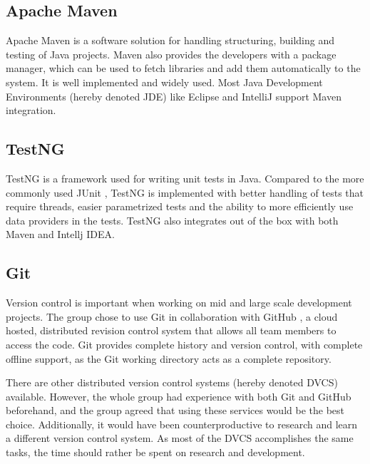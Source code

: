 \subsection{Apache Maven}
\label{subsec:prestudies-tools-apache_maven}

Apache Maven is a software solution for handling structuring, building and testing of Java projects. Maven also provides the developers with a package manager, which can be used to fetch libraries and add them automatically to the system. It is well implemented and widely used. Most Java Development Environments (hereby denoted JDE) like Eclipse and IntelliJ support Maven integration.

\subsection{TestNG}
\label{subsec:prestudies-tools-testng}

TestNG \cite{test-ng} is a framework used for writing unit tests in Java. Compared to the more commonly used JUnit \cite{junit}, TestNG is implemented with better handling of tests that require threads, easier parametrized tests and the ability to more efficiently use data providers in the tests. TestNG also integrates out of the box with both Maven and Intellj IDEA.

\subsection{Git}
\label{subsec:prestudies-tools-git}

Version control is important when working on mid and large scale development projects. The group chose to use Git \cite{git} in collaboration with GitHub \cite{github}, a cloud hosted, distributed revision control system that allows all team members to access the code. Git provides complete history and version control, with complete offline support, as the Git working directory acts as a complete repository.

There are other distributed version control systems (hereby denoted DVCS) available. However, the whole group had experience with both Git and GitHub beforehand, and the group agreed that using these services would be the best choice. Additionally, it would have been counterproductive to research and learn a different version control system. As most of the DVCS accomplishes the same tasks, the time should rather be spent on research and development.


